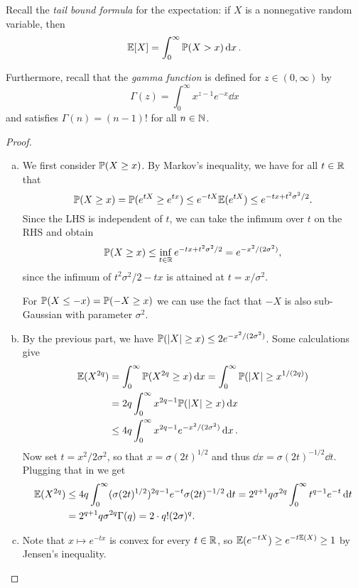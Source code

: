 \begin{recap}
    Recall the \emph{tail bound formula} for the expectation: if $X$ is a nonnegative random variable, then 
    \[
    \mathbb E[X] = \int_0^\infty \mathbb P(X > x) \dd{x}. 
    \]
    
    Furthermore, recall that the \emph{gamma function} is defined for $z \in (0, \infty)$ by
    \[
    \Gamma(z) = \int_0^\infty x^{z-1} e^{-x} \dd{x}
    \]
    and satisfies $\Gamma(n) = (n-1)!$ for all $n \in \mathbb N$. 
\end{recap}
\begin{proof}
    \begin{enumerate}[(a)]
        \item We first consider $\mathbb P(X \geq x)$. 
        By Markov's inequality, we have for all $t \in \mathbb R$ that
        \[
        \mathbb P(X \geq x) = \mathbb P(e^{tX} \geq e^{tx}) \leq e^{-tX} \mathbb E(e^{tX}) \leq e^{-tx + t^2\sigma^2/2}.  
        \]
        Since the LHS is independent of $t$, we can take the infimum over $t$ on the RHS and obtain
        \[
        \mathbb P(X \geq x) \leq \inf_{t \in \mathbb R} e^{-tx + t^2\sigma^2/2} = e^{-x^2/(2\sigma^2)}, 
        \]
        since the infimum of $t^2\sigma^2/2 - tx$ is attained at $t = x/\sigma^2$. 
        
        For $\mathbb P(X \leq -x) = \mathbb P(-X \geq x)$ we can use the fact that $-X$ is also sub-Gaussian with parameter $\sigma^2$. 
        
        \item By the previous part, we have $\mathbb P(\abs{X} \geq x) \leq 2 e^{-x^2/(2\sigma^2)}$. Some calculations give
        \begin{align*}
            \mathbb E(X^{2q}) &= \int_0^\infty \mathbb P(X^{2q} \geq x) \dd{x} = \int_0^\infty \mathbb P(\abs{X} \geq x^{1/(2q)}) \\
            &= 2q \int_0^\infty x^{2q - 1} \mathbb P(\abs{X}\geq x)\dd{x} \\
             &\leq 4q \int_0^\infty x^{2q - 1} e^{-x^2/(2\sigma^2)} \dd{x}.
        \end{align*}
    Now set $t = x^2/2\sigma^2$, so that $x = \sigma (2t)^{1/2}$ and thus $\dd{x} = \sigma (2t)^{-1/2} \dd{t}$. Plugging that in we get
    \begin{align*}
    \mathbb E(X^{2q}) &\leq 4q \int_0^\infty (\sigma(2t)^{1/2})^{2q - 1} e^{-t} \sigma (2t)^{-1/2} \dd{t} = 2^{q+1} q \sigma^{2q} \int_0^\infty t^{q-1} e^{-t} \dd{t} \\
    &= 2^{q+1} q \sigma^{2q} \Gamma(q) = 2 \cdot q! (2\sigma)^q. 
    \end{align*}

\item Note that $x \mapsto e^{-tx}$ is convex for every $t \in \mathbb R$, so $\mathbb E(e^{-tX}) \geq e^{-t \mathbb E(X)} \geq 1$ by Jensen's inequality.
    \end{enumerate}
\end{proof}
